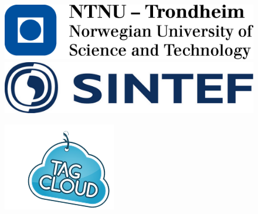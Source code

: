 \documentclass[11pt]{book}
\begin{document}
\begin{titlepage}
\begin{center}
		
		\begin{figure}[hb]
			\begin{minipage}[b]{0.45\linewidth}
				\centering
				\includegraphics[width=\textwidth]{images/ntnu_logo}
			\end{minipage}
			\hspace{0.5cm}
			\begin{minipage}[b]{0.45\linewidth}
				\centering
				\includegraphics[width=\textwidth]{images/sintef}
			\end{minipage}
		\end{figure}
		\begin{figure}[hb]
			\begin{minipage}[b]{0.45\linewidth}
				\centering
				\includegraphics[width=\textwidth]{images/tagcloud}
			\end{minipage}
			\hspace{0.5cm}
			\begin{minipage}[b]{0.35\linewidth}

\end{minipage}
\end{figure}
\end{center}
\end{titlepage}
\end{document}
